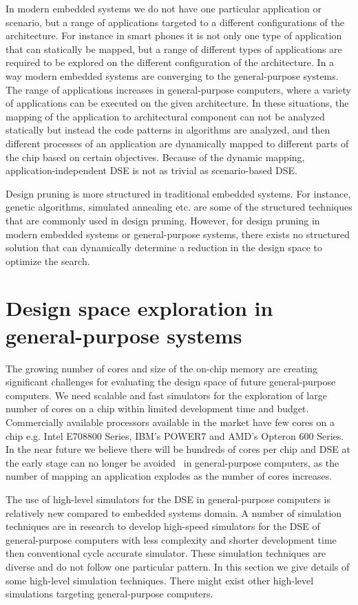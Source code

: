 \documentclass{article}
\begin{document}
In modern embedded systems we do not have one particular application or
scenario, but a range of applications targeted to a different configurations of
the architecture. For instance in smart phones it is not only one type of
application that can statically be mapped, but a range of different types of
applications are required to be explored on the different configuration of the
architecture. In a way modern embedded systems are converging to the
general-purpose systems. The range of applications increases in general-purpose
computers, where a variety of applications can be executed on the given
architecture. In these situations, the mapping of the application to
architectural component can not be analyzed statically but instead the code
patterns in algorithms are analyzed, and then different processes of an
application are dynamically mapped to different parts of the chip based on
certain objectives. Because of the dynamic mapping, application-independent DSE
is not as trivial as scenario-based DSE.

Design pruning is more structured in traditional embedded systems. For
instance, genetic algorithms, simulated annealing etc. are some of the structured
techniques that are commonly used in design pruning. However, for design
pruning in modern embedded systems or general-purpose systems, there exists
no structured solution that can dynamically determine a reduction in the design
space to optimize the search.

\section{Design space exploration in general-purpose systems}

The growing number of cores and size of the on-chip memory are creating
significant challenges for evaluating the design space of future
general-purpose computers. We need scalable and fast simulators for the
exploration of large number of cores on a chip within limited development time
and budget. Commercially available processors available in the market have few
cores on a chip e.g. Intel E708800 Series, IBM's POWER7 and AMD's Opteron 600
Series. In the near future we believe there will be hundreds of cores per chip
and DSE at the early stage can no longer be
avoided~\cite{Carlson:2011:SEL:2063384.2063454} in general-purpose computers,
as the number of mapping an application explodes as the number of cores increases.

The use of high-level simulators for the DSE in general-purpose computers is
relatively new compared to embedded systems domain. A number of simulation
techniques are in research to develop high-speed simulators for the DSE of
general-purpose computers with less complexity and shorter development time
then conventional cycle accurate simulator.
These simulation techniques are diverse and do not follow one particular
pattern. In this section we give details of some high-level simulation
techniques. There might exist other high-level simulations targeting
general-purpose computers.
\end{document}
